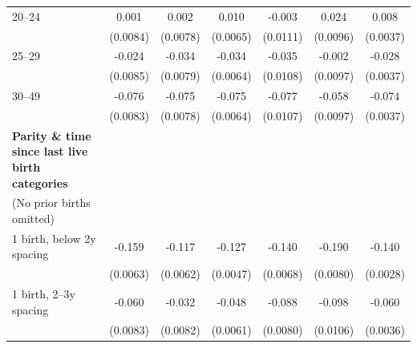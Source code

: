 {\begin{tabular}{l*{6}{c}}
\addlinespace
\hspace*{1em}20–24               &       0.001         &       0.002         &       0.010         &      -0.003         &       0.024\sym{*}  &       0.008\sym{*}  \\
                    &    (0.0084)         &    (0.0078)         &    (0.0065)         &    (0.0111)         &    (0.0096)         &    (0.0037)         \\
\addlinespace
\hspace*{1em}25–29               &      -0.024\sym{**} &      -0.034\sym{***}&      -0.034\sym{***}&      -0.035\sym{**} &      -0.002         &      -0.028\sym{***}\\
                    &    (0.0085)         &    (0.0079)         &    (0.0064)         &    (0.0108)         &    (0.0097)         &    (0.0037)         \\
\addlinespace
\hspace*{1em}30–49               &      -0.076\sym{***}&      -0.075\sym{***}&      -0.075\sym{***}&      -0.077\sym{***}&      -0.058\sym{***}&      -0.074\sym{***}\\
                    &    (0.0083)         &    (0.0078)         &    (0.0064)         &    (0.0107)         &    (0.0097)         &    (0.0037)         \\
\addlinespace
\textbf{Parity \& time since last live birth categories} \\ (No prior births omitted)&                     &                     &                     &                     &                     &                     \\
\addlinespace
\hspace*{1em}1 birth, below 2y spacing&      -0.159\sym{***}&      -0.117\sym{***}&      -0.127\sym{***}&      -0.140\sym{***}&      -0.190\sym{***}&      -0.140\sym{***}\\
                    &    (0.0063)         &    (0.0062)         &    (0.0047)         &    (0.0068)         &    (0.0080)         &    (0.0028)         \\
\addlinespace
\hspace*{1em}1 birth, 2–3y spacing&      -0.060\sym{***}&      -0.032\sym{***}&      -0.048\sym{***}&      -0.088\sym{***}&      -0.098\sym{***}&      -0.060\sym{***}\\
                    &    (0.0083)         &    (0.0082)         &    (0.0061)         &    (0.0080)         &    (0.0106)         &    (0.0036)         \\

\end{tabular}}
